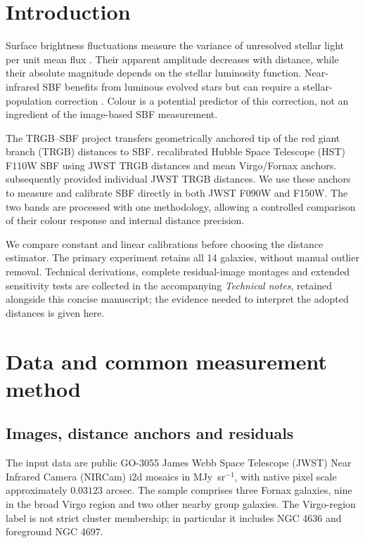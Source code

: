 \documentclass[nodoi,nocopyright]{pas}
\begin{document}
\section{Introduction}

Surface brightness fluctuations measure the variance of unresolved stellar
light per unit mean flux \citep{TonrySchneider1988}. Their apparent amplitude
decreases with distance, while their absolute magnitude depends on the
stellar luminosity function. Near-infrared SBF benefits from luminous evolved
stars but can require a stellar-population correction
\citep{Jensen2003,Jensen2015,Jensen2021}. Colour is a potential predictor of
this correction, not an ingredient of the image-based SBF measurement.

The TRGB--SBF project transfers geometrically anchored tip of the red giant
branch (TRGB) distances to SBF. \citet[Paper III]{Jensen2025} recalibrated
Hubble Space Telescope (HST) F110W SBF using JWST TRGB distances and mean Virgo/Fornax
anchors. \citet[Paper IV]{Chazov2026} subsequently provided individual
JWST TRGB distances. We use these anchors to measure and calibrate SBF
directly in both JWST F090W and F150W. The two bands are processed with
one methodology, allowing a controlled comparison of their colour response
and internal distance precision.

We compare constant and linear calibrations before choosing the distance
estimator. The primary experiment retains all 14 galaxies, without manual
outlier removal. Technical derivations, complete residual-image montages and
extended sensitivity tests are collected in the accompanying
\emph{Technical notes}, retained alongside this concise manuscript;
the evidence needed to interpret the adopted distances is given here.

\section{Data and common measurement method}
\label{sec:method}

\subsection{Images, distance anchors and residuals}

The input data are public GO-3055 James Webb Space Telescope (JWST)
Near Infrared Camera (NIRCam) i2d mosaics in MJy~sr$^{-1}$,
with native pixel scale approximately $0.03123$ arcsec. The sample comprises
three Fornax galaxies, nine in the broad Virgo region and two other nearby
group galaxies. The Virgo-region label is not strict cluster membership;
in particular it includes NGC 4636 and foreground NGC 4697.
\end{document}
